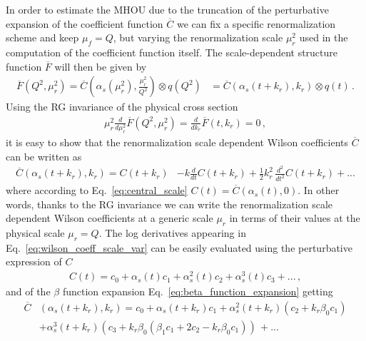 In order to estimate the MHOU due to the truncation of the perturbative expansion of the coefficient function 
$\overline{C}$ we can fix a specific renormalization scheme and keep $\mu_f = Q$, but varying
the renormalization scale $\mu_r^2$ used in the computation of the coefficient function itself.
The scale-dependent structure function $\overline{F}$ will then be given by
\begin{align}
    \overline{F}\left(Q^2,\mu_r^2\right) = 
    \overline{C}\left(\alpha_s\left(\mu_r^2\right),\frac{\mu_r^2}{Q^2}\right)\otimes q\left(Q^2\right) 
    &=\overline{C}\left(\alpha_s\left(t+k_r\right),k_r\right)\otimes q\left(t\right)\,.
\end{align}
Using the RG invariance of the physical cross section
\begin{align}
    \label{eq:RG_invariance}
    \mu_r^2\frac{d}{d\mu_r^2}\overline{F}\left(Q^2,\mu_r^2\right) = \frac{d}{dk_r}\overline{F}\left(t,k_r\right)=0\,,
\end{align}
it is easy to show that
the renormalization scale dependent Wilson coefficients $\overline{C}$ can be written as
\begin{align}
    \label{eq:wilson_coeff_scale_var}
    \overline{C}\left(\alpha_s\left(t+k_r\right),k_r\right) =
    C\left(t+k_r\right) &-  k\frac{d}{dt}C\left(t+k_r\right) 
    + \frac{1}{2} k_r^2\, \frac{d^2}{dt^2}C\left(t+k_r\right) + ...
\end{align}
where according to Eq.~\ref{eq:central_scale} $C\left(t\right) = \overline{C}\left(\alpha_s\left(t\right),0\right)$.
In other words, thanks to the RG invariance we can write the renormalization scale dependent Wilson coefficients
at a generic scale $\mu_r$ in terms of their values at the physical scale $\mu_r=Q$.
The log derivatives appearing in Eq.~\ref{eq:wilson_coeff_scale_var} can be easily evaluated using the 
perturbative expression of $C$ 
\begin{align}
    C\left(t\right) = 
    c_0 + \alpha_s\left(t\right)c_1 + \alpha_s^2\left(t\right)c_2 + \alpha_s^3\left(t\right)c_3 + ...\,,
\end{align}
and of the $\beta$ function expansion Eq.~\ref{eq:beta_function_expansion} getting
\begin{align}
    \label{eq:scale_varied_wilson_coeff}
    \overline{C}&\left(\alpha_s\left(t+k_r\right),k_r\right) = c_0 
    + \alpha_s\left(t+k_r\right)c_1 + \alpha_s^2\left(t+k_r\right)\left(c_2 + k_r\beta_0 c_1\right) \nonumber \\
    &+ \alpha_s^3\left(t+k_r\right)\left(c_3 + k_r\beta_0\left(\beta_1c_1 +2c_2 - k_r\beta_0 c_1\right)\right)\, + ...
\end{align} 

